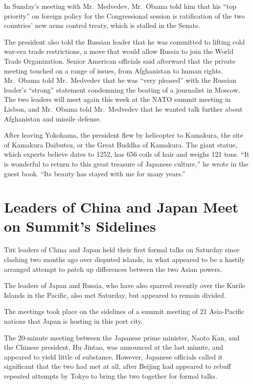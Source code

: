 ﻿\documentclass[12pt]{article}
\begin{document}
In Sunday's meeting with Mr.~Medvedev, Mr.~Obama told him that his ``top priority'' on foreign
policy for the Congressional session is ratification of the two countries' new arms control treaty,
which is stalled in the Senate.

The president also told the Russian leader that he was committed to lifting cold war-era trade
restrictions, a move that would allow Russia to join the World Trade Organization. Senior American
officials said afterward that the private meeting touched on a range of issues, from Afghanistan to
human rights. Mr.~Obama told Mr.~Medvedev that he was ``very pleased'' with the Russian leader's
``strong'' statement condemning the beating of a journalist in Moscow. The two leaders will meet
again this week at the NATO summit meeting in Lisbon, and Mr.~Obama told Mr.~Medvedev that he wanted
talk further about Afghanistan and missile defense.

After leaving Yokohama, the president flew by helicopter to Kamakura, the site of Kamakura Daibutsu,
or the Great Buddha of Kamakura. The giant statue, which experts believe dates to 1252, has 656
coils of hair and weighs 121 tons. ``It is wonderful to return to this great treasure of Japanese
culture,'' he wrote in the guest book. ``Its beauty has stayed with me for many years.''

\section{Leaders of China and Japan Meet on Summit's Sidelines}

\lettrine{T}{he} leaders of China and Japan held their first formal talks on
Saturday since clashing two months ago over disputed islands, in what appeared to be a hastily
arranged attempt to patch up differences between the two Asian powers.

The leaders of Japan and Russia, who have also sparred recently over the Kurile Islands in the
Pacific, also met Saturday, but appeared to remain divided.

The meetings took place on the sidelines of a summit meeting of 21 Asia-Pacific nations that Japan
is hosting in this port city.

The 20-minute meeting between the Japanese prime minister, Naoto Kan, and the Chinese president, Hu
Jintao, was announced at the last minute, and appeared to yield little of substance. However,
Japanese officials called it significant that the two had met at all, after Beijing had appeared to
rebuff repeated attempts by Tokyo to bring the two together for formal talks.
\end{document}

